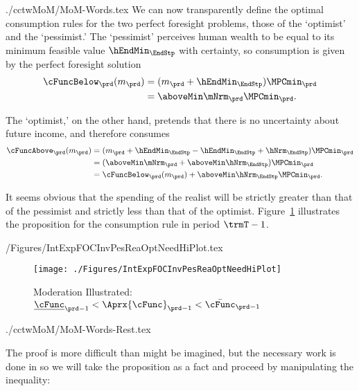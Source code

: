 \documentclass[\econtexRoot/SolvingMicroDSOPs]{subfiles}
\begin{document}
\begin{verbatimwrite}{./cctwMoM/MoM-Words.tex}
  We can now transparently define the optimal
  consumption rules for the two perfect foresight problems, those of the
  `optimist' and the `pessimist.'  The `pessimist' perceives human
  wealth to be equal to its minimum feasible value $\hEndMin_{\EndStp}$ with certainty, so
  consumption is given by the perfect foresight solution
  \begin{equation*}\begin{gathered}\begin{aligned}
        \cFuncBelow_{\prd}(m_{\prd})  & = (m_{\prd}+\hEndMin_{\EndStp})\MPCmin_{\prd}
        \\  & = \aboveMin \mNrm_{\prd}\MPCmin_{\prd}
        .
      \end{aligned}\end{gathered}\end{equation*}

  The `optimist,' on the other hand, pretends that there is no uncertainty
  about future income, and therefore consumes
  \begin{equation*}\begin{gathered}\begin{aligned}
        \cFuncAbove_{\prd}(m_{\prd})  & = (m_{\prd} +\hEndMin_{\EndStp} - \hEndMin_{\EndStp} + \hNrm_{\EndStp} )\MPCmin_{\prd}
        \\    & = (\aboveMin \mNrm_{\prd} + \aboveMin \hNrm_{\EndStp})\MPCmin_{\prd}
        \\      & = \cFuncBelow_{\prd}(m_{\prd})+\aboveMin \hNrm_{\EndStp} \MPCmin_{\prd}
        .
      \end{aligned}\end{gathered}\end{equation*}

  It seems obvious that the spending of the realist will be strictly greater
  than that of the pessimist and strictly less than that of the
  optimist.  Figure~\ref{fig:IntExpFOCInvPesReaOptNeedHiPlot} illustrates the proposition for the consumption rule in period $\trmT-1$.
\end{verbatimwrite}
\unskip
\begin{verbatimwrite}{\econtexRoot/Figures/IntExpFOCInvPesReaOptNeedHiPlot.tex}
  \hypertarget{IntExpFOCInvPesReaOptNeedHiPlot}{}
  \begin{figure}
    \texttt{[image: ./Figures/IntExpFOCInvPesReaOptNeedHiPlot]}
    \caption{Moderation Illustrated: $\underline{\cFunc}_{\prd-1} < \Aprx{\cFunc}_{\prd-1} < \bar{\cFunc}_{\prd-1}$}
    \label{fig:IntExpFOCInvPesReaOptNeedHiPlot}
  \end{figure}
\end{verbatimwrite}
\unskip
\begin{verbatimwrite}{./cctwMoM/MoM-Words-Rest.tex}

  \indent The proof is more difficult than might be imagined, but
  the necessary work is done in \cite{BufferStockTheory} so we will take
  the proposition as a fact and proceed by manipulating the inequality:
\end{verbatimwrite}
\unskip
\end{document}
